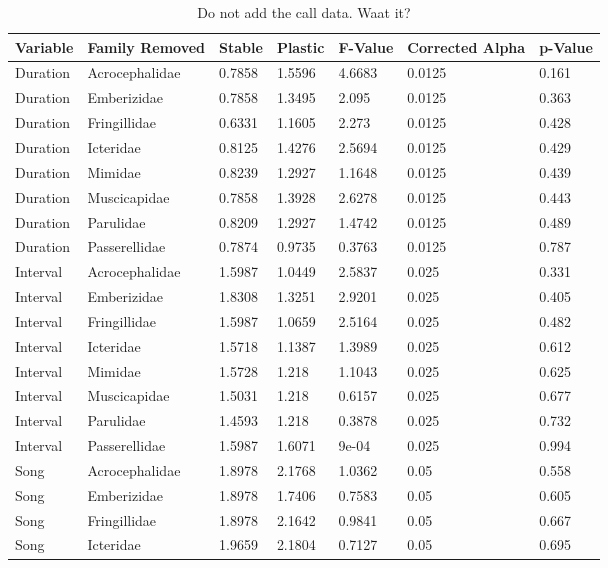 \documentclass{article}\usepackage[]{graphicx}\usepackage[]{color}
\begin{document}
\begin{table}[ht]
\centering
\caption{Do not add the call data.  Waat it?}
\begin{tabular}{lllllll}
  \hline
Variable & Family Removed & Stable & Plastic & F-Value & Corrected Alpha & p-Value \\ 
  \hline
Duration & Acrocephalidae & 0.7858 & 1.5596 & 4.6683 & 0.0125 & 0.161 \\ 
  Duration & Emberizidae & 0.7858 & 1.3495 & 2.095 & 0.0125 & 0.363 \\ 
  Duration & Fringillidae & 0.6331 & 1.1605 & 2.273 & 0.0125 & 0.428 \\ 
  Duration & Icteridae & 0.8125 & 1.4276 & 2.5694 & 0.0125 & 0.429 \\ 
  Duration & Mimidae & 0.8239 & 1.2927 & 1.1648 & 0.0125 & 0.439 \\ 
  Duration & Muscicapidae & 0.7858 & 1.3928 & 2.6278 & 0.0125 & 0.443 \\ 
  Duration & Parulidae & 0.8209 & 1.2927 & 1.4742 & 0.0125 & 0.489 \\ 
  Duration & Passerellidae & 0.7874 & 0.9735 & 0.3763 & 0.0125 & 0.787 \\ 
  Interval & Acrocephalidae & 1.5987 & 1.0449 & 2.5837 & 0.025 & 0.331 \\ 
  Interval & Emberizidae & 1.8308 & 1.3251 & 2.9201 & 0.025 & 0.405 \\ 
  Interval & Fringillidae & 1.5987 & 1.0659 & 2.5164 & 0.025 & 0.482 \\ 
  Interval & Icteridae & 1.5718 & 1.1387 & 1.3989 & 0.025 & 0.612 \\ 
  Interval & Mimidae & 1.5728 & 1.218 & 1.1043 & 0.025 & 0.625 \\ 
  Interval & Muscicapidae & 1.5031 & 1.218 & 0.6157 & 0.025 & 0.677 \\ 
  Interval & Parulidae & 1.4593 & 1.218 & 0.3878 & 0.025 & 0.732 \\ 
  Interval & Passerellidae & 1.5987 & 1.6071 & 9e-04 & 0.025 & 0.994 \\ 
  Song & Acrocephalidae & 1.8978 & 2.1768 & 1.0362 & 0.05 & 0.558 \\ 
  Song & Emberizidae & 1.8978 & 1.7406 & 0.7583 & 0.05 & 0.605 \\ 
  Song & Fringillidae & 1.8978 & 2.1642 & 0.9841 & 0.05 & 0.667 \\ 
  Song & Icteridae & 1.9659 & 2.1804 & 0.7127 & 0.05 & 0.695 \\ 

\end{tabular}
\end{table}
\end{document}

